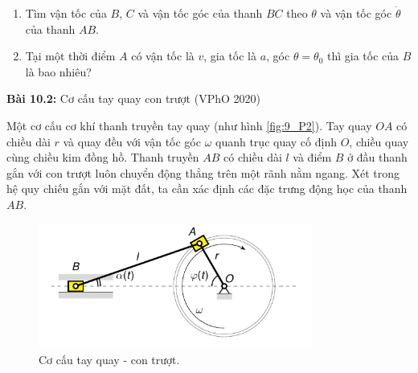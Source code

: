 \begin{enumerate}
    \item Tìm vận tốc của \(B\), \(C\) và vận tốc góc của thanh \(BC\) theo \(\theta\) và vận tốc góc \(\dot{\theta}\) của thanh \(AB\).
    \item Tại một thời điểm \(A\) có vận tốc là \(v\), gia tốc là \(a\), góc \(\theta=\theta_0\) thì gia tốc của \(B\) là bao nhiêu?
\end{enumerate}

\textbf{Bài 10.2:} Cơ cấu tay quay con trượt (VPhO 2020)

Một cơ cấu cơ khí thanh truyền tay quay (như hình \ref{fig:9_P2}). 
Tay quay \(OA\) có chiều dài \(r\) và quay đều với vận tốc góc \(\omega\) quanh trục quay cố định \(O\), chiều quay cùng chiều kim đồng hồ. 
Thanh truyền \(AB\) có chiều dài \(l\) và điểm \(B\) ở đầu thanh gắn với con trượt luôn chuyển động thẳng trên một rãnh nằm ngang. 
Xét trong hệ quy chiếu gắn với mặt đất, ta cần xác định các đặc trưng động học của thanh \(AB\).

\begin{figure}[!h]
    \centering
    \includegraphics[width=0.8\textwidth]{Tuan10/Figures/Slider_Crank/Slider_Crank.pdf}
    \caption{Cơ cấu tay quay - con trượt.}
    \label{fig:Slider_Crank}
\end{figure}

